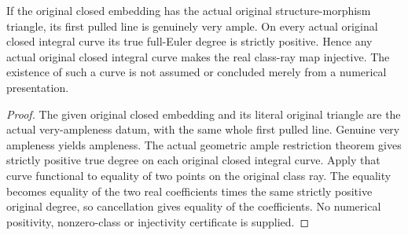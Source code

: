 \begin{theorem}
\label{thm:native-pulled-projective-numerical-ray}
\leanok
{}
If the original closed embedding has the actual original structure-morphism
triangle, its first pulled line is genuinely very ample. On every actual
original closed integral curve its true full-Euler degree is strictly
positive. Hence any actual original closed integral curve makes the real
class-ray map injective. The existence of such a curve is not assumed or
concluded merely from a numerical presentation.
\end{theorem}
\begin{proof}
The given original closed embedding and its literal original triangle
are the actual very-ampleness datum, with the same whole first pulled
line. Genuine very ampleness yields ampleness. The actual geometric
ample restriction theorem gives strictly positive true degree on each
original closed integral curve. Apply that curve functional to equality
of two points on the original class ray. The equality becomes equality
of the two real coefficients times the same strictly positive original
degree, so cancellation gives equality of the coefficients. No numerical
positivity, nonzero-class or injectivity certificate is supplied.
\end{proof}
